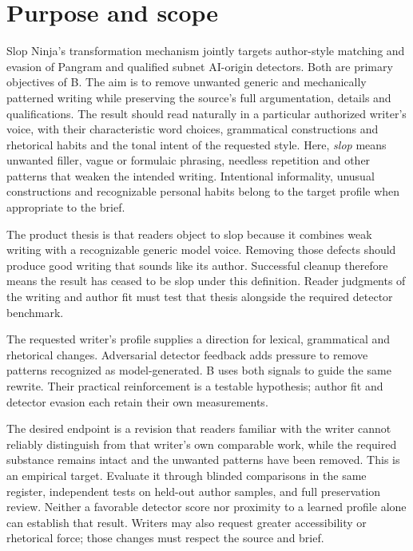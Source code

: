 \section{Purpose and scope}\label{purpose-and-scope}

Slop Ninja's transformation mechanism jointly targets author-style
matching and evasion of Pangram and qualified subnet AI-origin detectors.
Both are primary objectives of B. The aim is to remove unwanted generic
and mechanically patterned writing while preserving the source's full
argumentation, details and qualifications. The result
should read naturally in a particular authorized writer's voice, with
their characteristic word choices, grammatical constructions and
rhetorical habits and the tonal intent of the requested style.
Here, \emph{slop} means unwanted filler, vague or
formulaic phrasing, needless repetition and other patterns that weaken
the intended writing. Intentional informality, unusual constructions
and recognizable personal habits belong to the target profile when
appropriate to the brief.

The product thesis is that readers object to slop because it combines
weak writing with a recognizable generic model voice. Removing those
defects should produce good writing that sounds like its author.
Successful cleanup therefore means the result has ceased to be slop
under this definition. Reader judgments of the writing and author fit
must test that thesis alongside the required detector benchmark.

The requested writer's profile supplies a direction for lexical,
grammatical and rhetorical changes. Adversarial detector feedback adds
pressure to remove patterns recognized as model-generated. B uses both
signals to guide the same rewrite. Their practical reinforcement is a
testable hypothesis; author fit and detector evasion each retain their
own measurements.

The desired endpoint is a revision that readers familiar with the
writer cannot reliably distinguish from that writer's own comparable
work, while the required substance remains intact and the unwanted
patterns have been removed. This is an empirical target. Evaluate it
through blinded comparisons in the same register, independent tests on
held-out author samples, and full preservation review. Neither a favorable
detector score nor proximity to a learned profile alone can establish
that result. Writers may also request greater accessibility or
rhetorical force; those changes must respect the source and brief.

